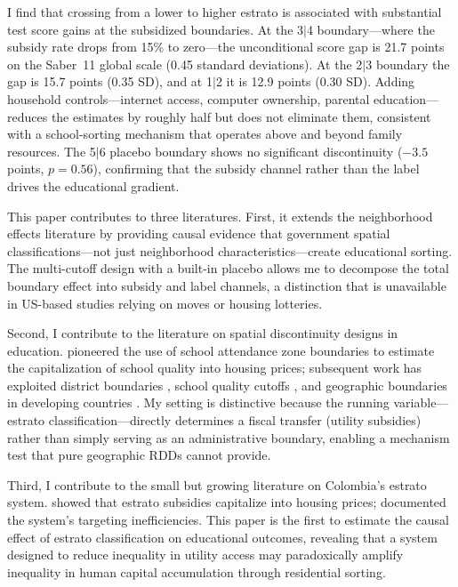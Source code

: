 \documentclass[12pt]{article}
\begin{document}
I find that crossing from a lower to higher estrato is associated with substantial test score gains at the subsidized boundaries. At the 3$|$4 boundary---where the subsidy rate drops from 15\% to zero---the unconditional score gap is 21.7 points on the Saber~11 global scale (0.45 standard deviations). At the 2$|$3 boundary the gap is 15.7 points (0.35 SD), and at 1$|$2 it is 12.9 points (0.30 SD). Adding household controls---internet access, computer ownership, parental education---reduces the estimates by roughly half but does not eliminate them, consistent with a school-sorting mechanism that operates above and beyond family resources. The 5$|$6 placebo boundary shows no significant discontinuity ($-3.5$ points, $p = 0.56$), confirming that the subsidy channel rather than the label drives the educational gradient.

This paper contributes to three literatures. First, it extends the neighborhood effects literature \citep{chetty2016effects, chetty2018opportunity} by providing causal evidence that government spatial classifications---not just neighborhood characteristics---create educational sorting. The multi-cutoff design with a built-in placebo allows me to decompose the total boundary effect into subsidy and label channels, a distinction that is unavailable in US-based studies relying on moves or housing lotteries.

Second, I contribute to the literature on spatial discontinuity designs in education. \citet{black1999better} pioneered the use of school attendance zone boundaries to estimate the capitalization of school quality into housing prices; subsequent work has exploited district boundaries \citep{bayer2007unified}, school quality cutoffs \citep{pop2014going}, and geographic boundaries in developing countries \citep{dell2010persistent}. My setting is distinctive because the running variable---estrato classification---directly determines a fiscal transfer (utility subsidies) rather than simply serving as an administrative boundary, enabling a mechanism test that pure geographic RDDs cannot provide.

Third, I contribute to the small but growing literature on Colombia's estrato system. \citet{medina2007stratification} showed that estrato subsidies capitalize into housing prices; \citet{gallego2021subsidies} documented the system's targeting inefficiencies. This paper is the first to estimate the causal effect of estrato classification on educational outcomes, revealing that a system designed to reduce inequality in utility access may paradoxically amplify inequality in human capital accumulation through residential sorting.
\end{document}
